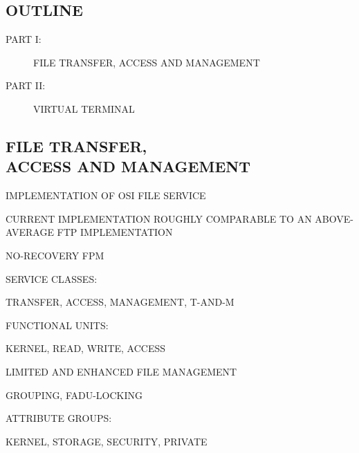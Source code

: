 


\begin{bwslide}
\part*	{OUTLINE}\bf

\begin{description}
\item[PART I:]	FILE TRANSFER, ACCESS AND MANAGEMENT

\item[PART II:]	VIRTUAL TERMINAL
\end{description}
\end{bwslide}


\begin{bwslide}
\part	{FILE TRANSFER,\\ ACCESS AND MANAGEMENT}\bf

\begin{nrtc}
\item	IMPLEMENTATION OF OSI FILE SERVICE

\item	CURRENT IMPLEMENTATION ROUGHLY COMPARABLE TO AN ABOVE-AVERAGE
	FTP IMPLEMENTATION
\end{nrtc}
\end{bwslide}


\begin{bwslide}

\begin{nrtc}
\item	NO-RECOVERY FPM

\item	SERVICE CLASSES:
    \begin{nrtc}
    \item	TRANSFER, ACCESS, MANAGEMENT, T-AND-M
    \end{nrtc}

\item	FUNCTIONAL UNITS:
    \begin{nrtc}
    \item	KERNEL, READ, WRITE, ACCESS

    \item	LIMITED AND ENHANCED FILE MANAGEMENT

    \item	GROUPING, FADU-LOCKING
    \end{nrtc}

\item	ATTRIBUTE GROUPS:
    \begin{nrtc}
    \item	KERNEL, STORAGE, SECURITY, PRIVATE
    \end{nrtc}
\end{nrtc}
\end{bwslide}



